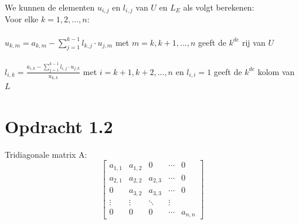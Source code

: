 \documentclass[a4paper]{article}
\begin{document}
We kunnen de elementen $u_{i,j}$ en $ l_{i,j}$ van $U$ en $L_{E}$ als volgt berekenen:
\\Voor elke $k = 1,2,...,n:$
\\{}
\\ \textbullet { } $u_{k,m} = a_{k,m} - \sum_{j=1}^{k-1}l_{k,j} \cdot u_{j,m} $ met $m = k,k+1,...,n$ geeft de $k^{de}$ rij van $U$
\\{}
\\ \textbullet { } $l_{i,k} = \frac{a_{i,k}-  \sum_{j=1}^{k-1}l_{i,j} \cdot u_{j,k}}{u_{k,k}}$ met $i = k+1,k+2,...,n$ en $l_{i,i} = 1$ geeft de $k^{de}$ kolom van $L$
%
%
%
%
%
%
\section*{Opdracht 1.2}
Tridiagonale matrix A:
\[ \begin{bmatrix}
  a_{1,1} & a_{1,2}& 0 & \cdots &0 \\
  a_{2,1} & a_{2,2}&a_{2,3} & \cdots &0 \\
 0 & a_{3,2}&a_{3,3} & \cdots &0 \\
  \vdots  & \vdots  & \ddots & \vdots  \\
 0 & 0 &0 & \cdots & a_{n,n} 
 \end{bmatrix}\]
\\{}
\end{document}
